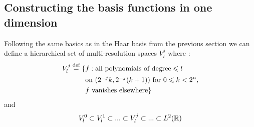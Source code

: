 \documentclass[../master_thesis.tex]{subfiles}
\begin{document}
\subsection{Constructing the basis functions in one dimension}
Following the same basics as in the Haar basis from the previous section we can
define a hierarchical set of multi-resolution spaces $V^j_l$ where \cite{Frediani:2013}:
\begin{align}
  \begin{split}
    V^j_l \stackrel{\text{def}}{=} \{&f: \text{all polynomials of degree} \leqslant
    l\  \\
    &\text{on}\  (2^{-j}k,2^{-j}(k+1))\ \text{for}\ 0\leqslant k < 2^{n},\\
    &f\  \text{vanishes elsewhere}\}
  \end{split}
\end{align}
and
\begin{equation}
  V^0_l \subset V^1_l \subset ... \subset V_l^j \subset ... \subset L^2(\mathbb{R})
\end{equation}
\end{document}
